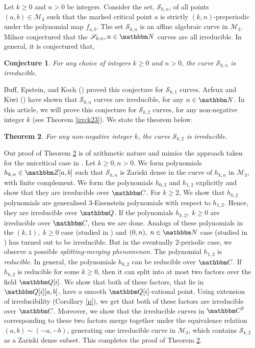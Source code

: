 \documentclass[reqno]{amsart}
\numberwithin{equation}{section}
\theoremstyle{plain}
\newtheorem{theorem}{Theorem}[section]
\newtheorem{conjecture}[theorem]{Conjecture}
\theoremstyle{definition}
\theoremstyle{definition}
\newcommand{\Q}{{\mathbbm Q}}
\newcommand{\Z}{{\mathbbm Z}}
\newcommand{\C}{{\mathbbm C}}
\newcommand{\N}{{\mathbbm N}}
\begin{document}
    Let $k \geq 0$ and $n >0$ be integers. Consider the set, $\mathscr{S}_{k,n}$, of all points $(a,b)\in \mathcal{M}_{3}$ such that the marked critical point $a$ is strictly $(k,n)$-preperiodic under the polynomial map $f_{a,b}$. The set $\mathscr{S}_{k,n}$ is an affine algebraic curve in $\mathcal{M}_{3}$. Milnor \cite{inbook} conjectured that the $\mathscr{S}_{0,n}, n\in \N$ curves are all irreducible. In general, it is conjectured that,
    \begin{conjecture}
        For any choice of integers $k\geq 0$ and $n>0$, the curve $\mathscr{S}_{k,n}$ is irreducible.
    \end{conjecture}
    Buff, Epstein, and Koch (\cite{article1}) proved this conjecture for $\mathscr{S}_{k,1}$ curves. Arfeux and Kiwi (\cite{AK20}) have shown that $\mathscr{S}_{0,n}$ curves are irreducible, for any $n \in \N$. In this article, we will prove this conjecture for $\mathscr{S}_{k,2}$ curves, for any non-negative integer $k$ (see Theorem \ref{irrck23}). We state the theorem below.
    \begin{theorem}\label{main1}
        For any non-negative integer $k$, the curve $\mathscr{S}_{k,2}$ is irreducible.
    \end{theorem}
    Our proof of Theorem \ref{main1} is of arithmetic nature and mimics the approach taken for the unicritical case in \cite{article1}. Let $k\geq 0, n>0$. We form polynomials $h_{k,n}\in \Z[a,b]$ such that $\mathscr{S}_{k,n}$ is Zariski dense in the curve of $h_{k,n}$ in $\mathcal{M}_{3}$, with finite complement. We form the polynomials $h_{0,2}$ and $h_{1,2}$ explicitly and show that they are irreducible over $\C$. For $k\geq 2$, We show that $h_{k,2}$ polynomials are generalised $3$-Eisenstein polynomials with respect to $h_{1,2}$. Hence, they are irreducible over $\Q$. If the polynomials $h_{k,2},\; k\geq 0$ are irreducible over $\C$, then we are done. Analogs of these polynomials in the $(k,1),\; k\geq 0$ case (studied in \cite{article1}) and $(0,n),\; n\in \N$ case (studied in \cite{AK20}) has turned out to be irreducible. But in the eventually $2$-periodic case, we observe a possible \emph{splitting-merging phenomenon}. The polynomial $h_{1,2}$ is \emph{reducible}. In general, the polynomials $h_{k,2}$ can be reducible over $\C$. If $h_{k,2}$ is reducible for some $k\geq 0$, then it can split into at most two factors over the field $\Q[i]$. We show that both of these factors, that lie in $\Q[i][a,b]$, have a smooth $\Q[i]$-rational point. Using extension of irreducibility (Corollary \ref{p}), we get that both of these factors are irreducible over $\C$. Moreover, we show that the irreducible curves in $\C^{2}$ corresponding to these two factors merge together under the equivalence relation $(a,b) \sim (-a,-b)$, generating one irreducible curve in $\mathcal{M}_{3}$, which contains $\mathscr{S}_{k,2}$ as a Zariski dense subset. This completes the proof of Theorem \ref{main1}.
\end{document}
